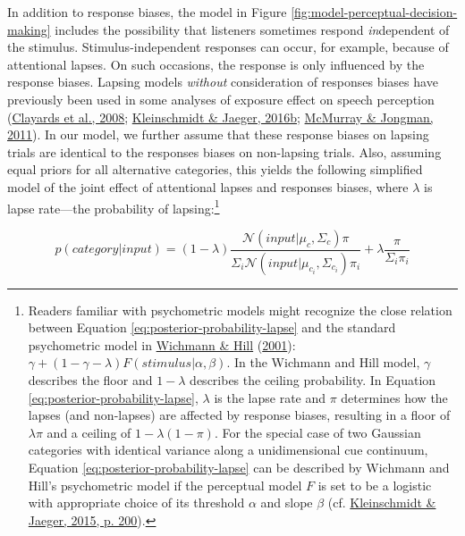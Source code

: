 \documentclass[
  11pt,
  english,
  man,floatsintext]{apa6}
\begin{document}
In addition to response biases, the model in Figure \ref{fig:model-perceptual-decision-making} includes the possibility that listeners sometimes respond \emph{in}dependent of the stimulus. Stimulus-independent responses can occur, for example, because of attentional lapses. On such occasions, the response is only influenced by the response biases. Lapsing models \emph{without} consideration of responses biases have previously been used in some analyses of exposure effect on speech perception (\protect\hyperlink{ref-clayards2008}{Clayards et al., 2008}; \protect\hyperlink{ref-kleinschmidt-jaeger2016cogsci}{Kleinschmidt \& Jaeger, 2016b}; \protect\hyperlink{ref-mcmurray-jongman2011}{McMurray \& Jongman, 2011}). In our model, we further assume that these response biases on lapsing trials are identical to the responses biases on non-lapsing trials. Also, assuming equal priors for all alternative categories, this yields the following simplified model of the joint effect of attentional lapses and responses biases, where \(\lambda\) is lapse rate---the probability of lapsing:\footnote{Readers familiar with psychometric models might recognize the close relation between Equation \eqref{eq:posterior-probability-lapse} and the standard psychometric model in \protect\hyperlink{ref-wichmann-hill2001}{Wichmann \& Hill} (\protect\hyperlink{ref-wichmann-hill2001}{2001}): \(\gamma + (1-\gamma-\lambda) F(stimulus | \alpha, \beta)\). In the Wichmann and Hill model, \(\gamma\) describes the floor and \(1-\lambda\) describes the ceiling probability. In Equation \eqref{eq:posterior-probability-lapse}, \(\lambda\) is the lapse rate and \(\pi\) determines how the lapses (and non-lapses) are affected by response biases, resulting in a floor of \(\lambda \pi\) and a ceiling of \(1 - \lambda(1 - \pi)\). For the special case of two Gaussian categories with identical variance along a unidimensional cue continuum, Equation \eqref{eq:posterior-probability-lapse} can be described by Wichmann and Hill's psychometric model if the perceptual model \(F\) is set to be a logistic with appropriate choice of its threshold \(\alpha\) and slope \(\beta\) (cf. \protect\hyperlink{ref-kleinschmidt-jaeger2015}{Kleinschmidt \& Jaeger, 2015, p. 200}).}

\begin{equation}\label{eq:posterior-probability-lapse}
p(category | input) = (1 - \lambda) \frac{\mathcal{N}\!\left( input | \mu_c, \Sigma_c \right) \pi}{\Sigma_i \mathcal{N}\!\left( input | \mu_{c_i}, \Sigma_{c_i} \right) \pi_i} + \lambda \frac{\pi}{\Sigma_i \pi_i}
\end{equation}
\end{document}
